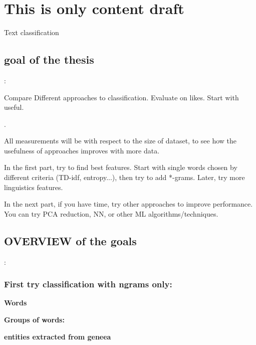 \chapter{This is only content draft}

Text classification

\section{goal of the thesis}:

Compare Different approaches to classification.  Evaluate on likes. Start with useful.

.

All measurements will be with respect to the size of dataset, to see how the usefulness of approaches improves with more data.

In the first part, try to find best features. Start with single words chosen by different
criteria (TD-idf, entropy...), then try to add *-grams. Later, try more linguistics features.

In the next part, if you have time, try other approaches to improve performance. You can try PCA reduction, NN, or other ML algorithms/techniques.

\section{OVERVIEW of the goals}:

\subsection{First try classification with ngrams only:}

\bf Words \rm





\bf Groups of words: \rm

\bf entities extracted from geneea \rm



